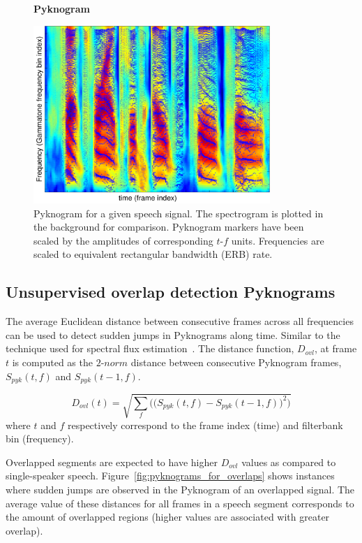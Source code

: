 {\begin{figure}[h!]
	\centering
	\vspace{4mm}
	\textbf{Pyknogram}\par\medskip
	\includegraphics[height =3.in, width=0.8\textwidth]{figures/pyknogram_vs_spectrogram}
	\vspace{-1mm}
	\caption{Pyknogram for a given speech signal. The spectrogram is plotted in the background for comparison. Pyknogram markers have been scaled by the amplitudes of corresponding $t$-$f$ units. Frequencies are scaled to equivalent rectangular bandwidth (ERB) rate.}
	\vspace{-1mm}
	\label{fig:pyknograms}
\end{figure}

\subsection{Unsupervised overlap detection Pyknograms}

The average Euclidean distance between consecutive frames across all frequencies can be used to detect sudden jumps in Pyknograms along time. 
Similar to the technique used for spectral flux estimation~\cite{Rossignol_spectralflux}. 
The distance function, $D_{ovl}$, at frame $t$ is computed as the $2$-$norm$ distance between consecutive Pyknogram frames, $S_{pyk}(t,f)$ and $S_{pyk}(t-1,f)$. 

\begin{equation}
\label{eq:ovl_det_score}
D_{ovl}(t) = \sqrt{\sum_f\Big(\big(S_{pyk}(t,f)-S_{pyk}(t-1,f)\big)^2\Big)}
\end{equation}
where $t$ and $f$ respectively correspond to the frame index (time) and filterbank bin (frequency). 

Overlapped segments are expected to have higher $D_{ovl}$ values as compared to single-speaker speech. 
Figure~\ref{fig:pyknograms_for_overlaps} shows instances where sudden jumps are observed in the Pyknogram of an overlapped signal. 
The average value of these distances for all frames in a speech segment corresponds to the amount of overlapped regions (higher values are associated with greater overlap). 

}
